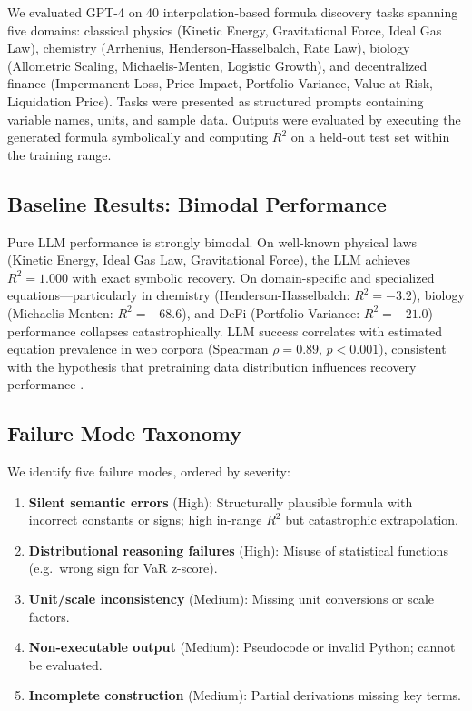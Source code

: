 \documentclass[twoside,11pt]{article}
\newcommand{\Rsq}{R^{2}}
\begin{document}
We evaluated GPT-4 \citep{openai2023gpt4} on 40 interpolation-based formula discovery tasks spanning five domains: classical physics (Kinetic Energy, Gravitational Force, Ideal Gas Law), chemistry (Arrhenius, Henderson-Hasselbalch, Rate Law), biology (Allometric Scaling, Michaelis-Menten, Logistic Growth), and decentralized finance (Impermanent Loss, Price Impact, Portfolio Variance, Value-at-Risk, Liquidation Price). Tasks were presented as structured prompts containing variable names, units, and sample data. Outputs were evaluated by executing the generated formula symbolically and computing $\Rsq$ on a held-out test set within the training range.

\subsection{Baseline Results: Bimodal Performance}
\label{sec:llm_baseline}

Pure LLM performance is strongly bimodal. On well-known physical laws (Kinetic Energy, Ideal Gas Law, Gravitational Force), the LLM achieves $\Rsq = 1.000$ with exact symbolic recovery. On domain-specific and specialized equations---particularly in chemistry (Henderson-Hasselbalch: $\Rsq = -3.2$), biology (Michaelis-Menten: $\Rsq = -68.6$), and DeFi (Portfolio Variance: $\Rsq = -21.0$)---performance collapses catastrophically. LLM success correlates with estimated equation prevalence in web corpora (Spearman $\rho = 0.89$, $p < 0.001$), consistent with the hypothesis that pretraining data distribution influences recovery performance \citep{kambhampati2024llms}.

\subsection{Failure Mode Taxonomy}
\label{sec:llm_failures}

We identify five failure modes, ordered by severity:
\begin{enumerate}
  \item \textbf{Silent semantic errors} (High): Structurally plausible formula with incorrect constants or signs; high in-range $\Rsq$ but catastrophic extrapolation.
  \item \textbf{Distributional reasoning failures} (High): Misuse of statistical functions (e.g.\ wrong sign for VaR z-score).
  \item \textbf{Unit/scale inconsistency} (Medium): Missing unit conversions or scale factors.
  \item \textbf{Non-executable output} (Medium): Pseudocode or invalid Python; cannot be evaluated.
  \item \textbf{Incomplete construction} (Medium): Partial derivations missing key terms.
\end{enumerate}
\end{document}
